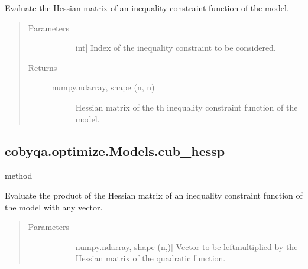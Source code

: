\documentclass[letterpaper,10pt,english]{sphinxmanual}
\begin{document}
\begin{fulllineitems}
\begin{fulllineitems}
\label{\detokenize{refs/generated/cobyqa.optimize.Models.cub_hess:cobyqa.optimize.Models.cub_hess}}
\sphinxAtStartPar
Evaluate the Hessian matrix of an inequality constraint function of the
model.
\begin{quote}\begin{description}
\item[{Parameters}] \leavevmode\begin{description}
\item[{}] \leavevmode{[}int{]}
\sphinxAtStartPar
Index of the inequality constraint to be considered.

\end{description}

\item[{Returns}] \leavevmode\begin{description}
\item[{numpy.ndarray, shape (n, n)}] \leavevmode
\sphinxAtStartPar
Hessian matrix of the \sphinxhyphen{}th inequality constraint function of the
model.

\end{description}

\end{description}\end{quote}

\end{fulllineitems}



\subsection{cobyqa.optimize.Models.cub\_hessp}
\label{\detokenize{refs/generated/cobyqa.optimize.Models.cub_hessp:cobyqa-optimize-models-cub-hessp}}\label{\detokenize{refs/generated/cobyqa.optimize.Models.cub_hessp::doc}}
\sphinxAtStartPar
method

\begin{fulllineitems}
\label{\detokenize{refs/generated/cobyqa.optimize.Models.cub_hessp:cobyqa.optimize.Models.cub_hessp}}
\sphinxAtStartPar
Evaluate the product of the Hessian matrix of an inequality constraint
function of the model with any vector.
\begin{quote}\begin{description}
\item[{Parameters}] \leavevmode\begin{description}
\item[{}] \leavevmode{[}numpy.ndarray, shape (n,){]}
\sphinxAtStartPar
Vector to be left\sphinxhyphen{}multiplied by the Hessian matrix of the quadratic
function.


\end{description}
\end{description}
\end{quote}
\end{fulllineitems}
\end{fulllineitems}
\end{document}
